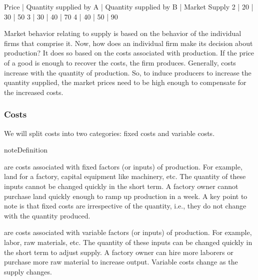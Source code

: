 \documentclass[letterpaper,10pt,english]{jupyterBook}
\begin{document}
\begin{sphinxVerbatim}[commandchars=\\\{\}]
Price | Quantity supplied by A | Quantity supplied by B | Market Supply
2     | 20                     | 30                     | 50
3     | 30                     | 40                     | 70
4     | 40                     | 50                     | 90
\end{sphinxVerbatim}

\noindent{}

\sphinxAtStartPar
Market behavior relating to supply is based on the behavior of the individual firms that comprise it. Now, how does an individual firm make its decision about production? It does so based on the costs associated with production. If the price of a good is enough to recover the costs, the firm produces. Generally, costs increase with the quantity of production. So, to induce producers to increase the quantity supplied, the market prices need to be high enough to compensate for the increased costs.


\subsubsection{Costs}
\label{\detokenize{content/02-supply/01-supply:costs}}
\sphinxAtStartPar
We will split costs into two categories: fixed costs and variable costs.

\begin{sphinxadmonition}{note}{Definition}

\sphinxAtStartPar
{} are costs associated with fixed factors (or inputs) of production. For example, land for a factory, capital equipment like machinery, etc. The quantity of these inputs cannot be changed quickly in the short term. A factory owner cannot purchase land quickly enough to ramp up production in a week. A key point to note is that fixed costs are irrespective of the quantity, i.e., they do not change with the quantity produced.

\sphinxAtStartPar
{} are costs associated with variable factors (or inputs) of production. For example, labor, raw materials, etc. The quantity of these inputs can be changed quickly in the short term to adjust supply. A factory owner can hire more laborers or purchase more raw material to increase output. Variable costs change as the supply changes.
\end{sphinxadmonition}
\end{document}
